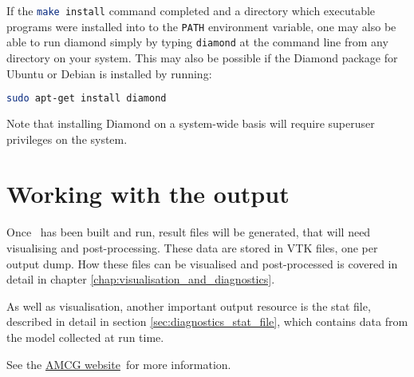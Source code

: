 If the \lstinline[language=Bash]+make install+ command completed and a directory
which executable programs were installed into to the
\lstinline[language=Bash]+PATH+ environment variable, one may also be able to run
diamond simply by typing \lstinline[language=Bash]+diamond+ at the command line
from any directory on your system. This may also be possible if the
Diamond package for Ubuntu or Debian is installed by running:

\begin{lstlisting}[language=Bash]
sudo apt-get install diamond
\end{lstlisting}

Note that installing Diamond on a system-wide basis will require superuser privileges on the system.

\section{Working with the output}
\label{sec:working_with_output}

Once \fluidity\ has been built and run, result files will be generated, that
will need visualising and post-processing. These data are stored in VTK files,
one per output dump.  How these files can be visualised and post-processed is
covered in detail in chapter \ref{chap:visualisation_and_diagnostics}.

As well as visualisation, another important output resource is the stat file,
described in detail in section \ref{sec:diagnostics_stat_file}, which contains
data from the model collected at run time.

See the \href{http://amcg-www.ese.ic.ac.uk/}{AMCG website}\ for more
information.
